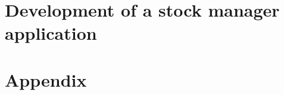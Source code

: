 \frenchspacing
\raggedbottom
{} %
\pagestyle{plain}

\pagestyle{scrheadings}
\cleardoublepage
\cleardoublepage\part{Development of a stock manager application}







\appendix
\cleardoublepage\part{Appendix}

\cleardoublepage

